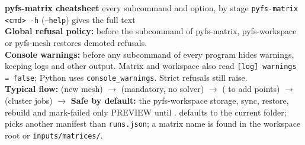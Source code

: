%
%
\fontsize{7.1}{8.1}\selectfont\raggedright
\begin{tcolorbox}[colback=acc!8,colframe=acc,boxrule=0.4pt,left=2pt,right=2pt,top=1pt,bottom=1pt]
{\large\bfseries\color{acc} pyfs-matrix cheatsheet} \hfill {\small \pkgname{} \textbf{\pkgversion} \quad every subcommand and option, by stage \quad \texttt{pyfs-matrix <cmd> -h} (\texttt{--help}) gives the full text}\\[1pt]
\textbf{Global refusal policy:}  before the subcommand of pyfs-matrix, pyfs-workspace or pyfs-mesh restores demoted refusals.\\[1pt]
\textbf{Console warnings:}  before any subcommand of every program hides warnings, keeping logs and other output. Matrix and workspace also read \texttt{[log] warnings = false}; Python uses \texttt{console\_warnings}. Strict refusals still raise.\\[1pt]
\textbf{Typical flow:}  (new mesh) $\rightarrow$  (mandatory, no solver) $\rightarrow$  ( to add points) $\rightarrow$  (cluster jobs) $\rightarrow$  \quad\textbar\quad
\textbf{Safe by default:} the pyfs-workspace storage, sync, restore, rebuild and mark-failed only PREVIEW until .  defaults to the current folder;  picks another manifest than \texttt{runs.json}; a matrix name is found in the workspace root or \texttt{inputs/matrices/}.
\end{tcolorbox}
\vspace{-3pt}
\fontsize{5.7}{6.35}\selectfont
